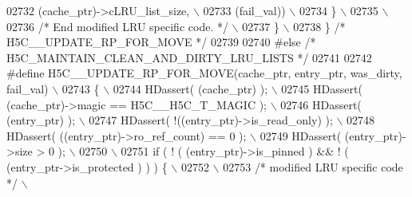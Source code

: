 \begin{DoxyCode}
02732 \textcolor{preprocessor}{                                      (cache\_ptr)->cLRU\_list\_size,           \(\backslash\)}
02733 \textcolor{preprocessor}{                      (fail\_val))                            \(\backslash\)}
02734 \textcolor{preprocessor}{            \}                                                                \(\backslash\)}
02735 \textcolor{preprocessor}{                                                                             \(\backslash\)}
02736 \textcolor{preprocessor}{            }\textcolor{comment}{/* End modified LRU specific code. */}\textcolor{preprocessor}{                            \(\backslash\)}
02737 \textcolor{preprocessor}{        \}                                                                    \(\backslash\)}
02738 \textcolor{preprocessor}{\} }\textcolor{comment}{/* H5C\_\_UPDATE\_RP\_FOR\_MOVE */}\textcolor{preprocessor}{}
02739 
02740 \textcolor{preprocessor}{#else }\textcolor{comment}{/* H5C\_MAINTAIN\_CLEAN\_AND\_DIRTY\_LRU\_LISTS */}\textcolor{preprocessor}{}
02741 
02742 \textcolor{preprocessor}{#define H5C\_\_UPDATE\_RP\_FOR\_MOVE(cache\_ptr, entry\_ptr, was\_dirty, fail\_val) \(\backslash\)}
02743 \textcolor{preprocessor}{\{                                                                            \(\backslash\)}
02744 \textcolor{preprocessor}{    HDassert( (cache\_ptr) );                                                 \(\backslash\)}
02745 \textcolor{preprocessor}{    HDassert( (cache\_ptr)->magic == H5C\_\_H5C\_T\_MAGIC );                      \(\backslash\)}
02746 \textcolor{preprocessor}{    HDassert( (entry\_ptr) );                                                 \(\backslash\)}
02747 \textcolor{preprocessor}{    HDassert( !((entry\_ptr)->is\_read\_only) );                                \(\backslash\)}
02748 \textcolor{preprocessor}{    HDassert( ((entry\_ptr)->ro\_ref\_count) == 0 );                            \(\backslash\)}
02749 \textcolor{preprocessor}{    HDassert( (entry\_ptr)->size > 0 );                                       \(\backslash\)}
02750 \textcolor{preprocessor}{                                                                             \(\backslash\)}
02751 \textcolor{preprocessor}{    if ( ! ( (entry\_ptr)->is\_pinned ) && ! ( (entry\_ptr->is\_protected ) ) ) \{ \(\backslash\)}
02752 \textcolor{preprocessor}{                                                                         \(\backslash\)}
02753 \textcolor{preprocessor}{        }\textcolor{comment}{/* modified LRU specific code */}\textcolor{preprocessor}{                                     \(\backslash\)}

\end{DoxyCode}
